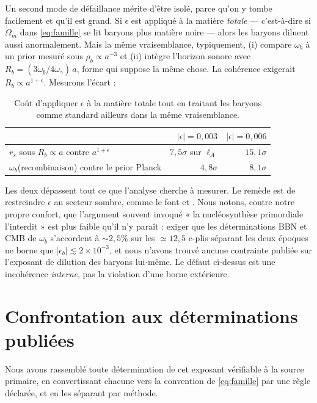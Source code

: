 \documentclass[11pt,a4paper]{article}
\begin{document}
Un second mode de défaillance mérite d'être isolé, parce qu'on y tombe facilement et qu'il est
grand. Si $\epsilon$ est appliqué à la matière \emph{totale} --- c'est-à-dire si $\Omega_m$
dans \eqref{eq:famille} se lit baryons plus matière noire --- alors les baryons diluent aussi
anormalement. Mais la même vraisemblance, typiquement, (i) compare $\omega_b$ à un prior
mesuré sous $\rho_b\propto a^{-3}$ et (ii) intègre l'horizon sonore avec
$R_b=(3\omega_b/4\omega_\gamma)\,a$, forme qui suppose la même chose. La cohérence exigerait
$R_b\propto a^{1+\epsilon}$. Mesurons l'écart :

\begin{table}[h]
\centering
\begin{tabular}{lrr}
\toprule
 & $|\epsilon|=0{,}003$ & $|\epsilon|=0{,}006$ \\
\midrule
$r_s$ sous $R_b\propto a$ contre $a^{1+\epsilon}$ & $7{,}5\sigma$ sur $\ell_A$ & $15{,}1\sigma$ \\
$\omega_b$(recombinaison) contre le prior Planck & $4{,}8\sigma$ & $8{,}1\sigma$ \\
\bottomrule
\end{tabular}
\caption{Coût d'appliquer $\epsilon$ à la matière totale tout en traitant les baryons comme
standard ailleurs dans la même vraisemblance.}
\label{tab:baryons}
\end{table}

Les deux dépassent tout ce que l'analyse cherche à mesurer. Le remède est de restreindre
$\epsilon$ au secteur sombre, comme le font \citet{kumar2025} et \citet{yaoliu2025}. Nous
notons, contre notre propre confort, que l'argument souvent invoqué « la nucléosynthèse
primordiale l'interdit » est plus faible qu'il n'y paraît : exiger que les déterminations BBN
et CMB de $\omega_b$ s'accordent à $\sim2{,}5\%$ sur les $\simeq12{,}5$ e-plis séparant les
deux époques ne borne que $|\epsilon_b|\lesssim2\times10^{-3}$, et nous n'avons trouvé aucune
contrainte publiée sur l'exposant de dilution des baryons lui-même. Le défaut ci-dessus est
une incohérence \emph{interne}, pas la violation d'une borne extérieure.

\section{Confrontation aux déterminations publiées}
\label{sec:litterature}

Nous avons rassemblé toute détermination de cet exposant vérifiable à la source primaire, en
convertissant chacune vers la convention de \eqref{eq:famille} par une règle déclarée, et en
les séparant par méthode.
\end{document}
